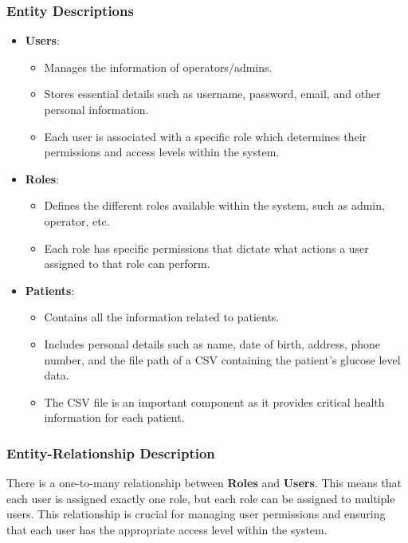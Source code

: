 \documentclass{article}
\begin{document}
\subsubsection{Entity Descriptions}
\begin{itemize}
    \item \textbf{Users}: 
    \begin{itemize}
        \item Manages the information of operators/admins.
        \item Stores essential details such as username, password, email, and other personal information.
        \item Each user is associated with a specific role which determines their permissions and access levels within the system.
    \end{itemize}
    
    \item \textbf{Roles}: 
    \begin{itemize}
        \item Defines the different roles available within the system, such as admin, operator, etc.
        \item Each role has specific permissions that dictate what actions a user assigned to that role can perform.
    \end{itemize}
    \item \textbf{Patients}: 
    \begin{itemize}
        \item Contains all the information related to patients.
        \item Includes personal details such as name, date of birth, address, phone number, and the file path of a CSV containing the patient’s glucose level data.
        \item The CSV file is an important component as it provides critical health information for each patient.
    \end{itemize}
\end{itemize}

\subsubsection{Entity-Relationship Description}

There is a one-to-many relationship between \textbf{Roles} and \textbf{Users}. This means that each user is assigned exactly one role, but each role can be assigned to multiple users. This relationship is crucial for managing user permissions and ensuring that each user has the appropriate access level within the system.
\end{document}
